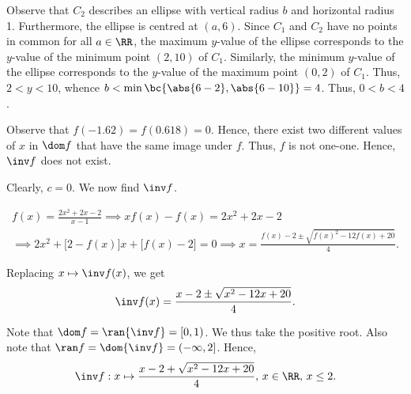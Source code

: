 \begin{solution}
\begin{ppart}
\begin{center}
        \end{center}
    \end{ppart}
    \begin{ppart}
        Observe that $C_2$ describes an ellipse with vertical radius $b$ and horizontal radius 1. Furthermore, the ellipse is centred at $(a, 6)$. Since $C_1$ and $C_2$ have no points in common for all $a \in \RR$, the maximum $y$-value of the ellipse corresponds to the $y$-value of the minimum point $(2, 10)$ of $C_1$. Similarly, the minimum $y$-value of the ellipse corresponds to the $y$-value of the maximum point $(0, 2)$ of $C_1$. Thus, $2 < y < 10$, whence $b < \min \bc{\abs{6-2}, \abs{6-10}} = 4$. Thus, $0 < b < 4$.
    \end{ppart}
    \begin{ppart}
        \begin{psubpart}
            Observe that $f(-1.62) = f(0.618) = 0$. Hence, there exist two different values of $x$ in $\dom f$ that have the same image under $f$. Thus, $f$ is not one-one. Hence, $\inv f$ does not exist.
        \end{psubpart}
        \begin{psubpart}
            Clearly, $c = 0$. We now find $\inv f$.

            \begin{gather*}
                f(x) = \frac{2x^2 + 2x - 2}{x-1} \implies xf(x) - f(x) = 2x^2 + 2x-2 \\
                \implies 2x^2 + \big[2- f(x)\big]x+ \big[f(x) - 2\big] = 0 \implies x = \frac{f(x) - 2 \pm \sqrt{f(x)^2 -12f(x) + 20}}{4}.
            \end{gather*}

            Replacing $x \mapsto \inv f(x)$, we get \[\inv f(x) = \frac{x - 2 \pm \sqrt{x^2 -12x + 20}}{4}.\]

            Note that $\dom f = \ran {\inv f} = [0, 1)$. We thus take the positive root. Also note that $\ran f = \dom {\inv f} = (-\infty, 2]$. Hence, \[\inv f : x \mapsto \frac{x - 2 + \sqrt{x^2 -12x + 20}}{4}, \, x \in \RR, \, x \leq 2.\]
        \end{psubpart}
    \end{ppart}
\end{solution}